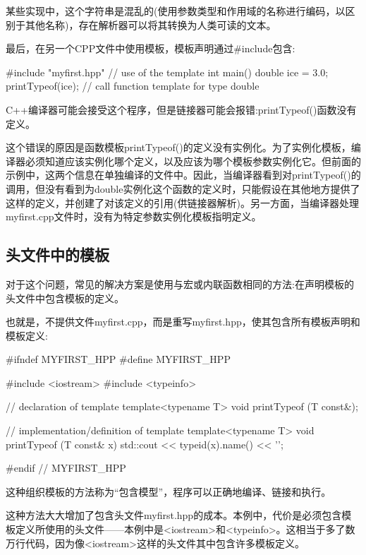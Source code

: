 \begin{notice}
某些实现中，这个字符串是混乱的(使用参数类型和作用域的名称进行编码，以区别于其他名称)，存在解析器可以将其转换为人类可读的文本。
\end{notice}

最后，在另一个CPP文件中使用模板，模板声明通过\#include包含:

\begin{cpp}
#include "myfirst.hpp"
// use of the template
int main()
{
	double ice = 3.0;
	printTypeof(ice); // call function template for type double
}
\end{cpp}

C++编译器可能会接受这个程序，但是链接器可能会报错:printTypeof()函数没有定义。

这个错误的原因是函数模板printTypeof()的定义没有实例化。为了实例化模板，编译器必须知道应该实例化哪个定义，以及应该为哪个模板参数实例化它。但前面的示例中，这两个信息在单独编译的文件中。因此，当编译器看到对printTypeof()的调用，但没有看到为double实例化这个函数的定义时，只能假设在其他地方提供了这样的定义，并创建了对该定义的引用(供链接器解析)。另一方面，当编译器处理myfirst.cpp文件时，没有为特定参数实例化模板指明定义。

\subsection{头文件中的模板}

对于这个问题，常见的解决方案是使用与宏或内联函数相同的方法:在声明模板的头文件中包含模板的定义。

也就是，不提供文件myfirst.cpp，而是重写myfirst.hpp，使其包含所有模板声明和模板定义:

\begin{cpp}
#ifndef MYFIRST_HPP
#define MYFIRST_HPP

#include <iostream>
#include <typeinfo>

// declaration of template
template<typename T>
void printTypeof (T const&);

// implementation/definition of template
template<typename T>
void printTypeof (T const& x)
{
	std::cout << typeid(x).name() << '\n';
}

#endif // MYFIRST_HPP
\end{cpp}

这种组织模板的方法称为“包含模型”，程序可以正确地编译、链接和执行。

这种方法大大增加了包含头文件myfirst.hpp的成本。本例中，代价是必须包含模板定义所使用的头文件——本例中是<iostream>和<typeinfo>。这相当于多了数万行代码，因为像<iostream>这样的头文件其中包含许多模板定义。

